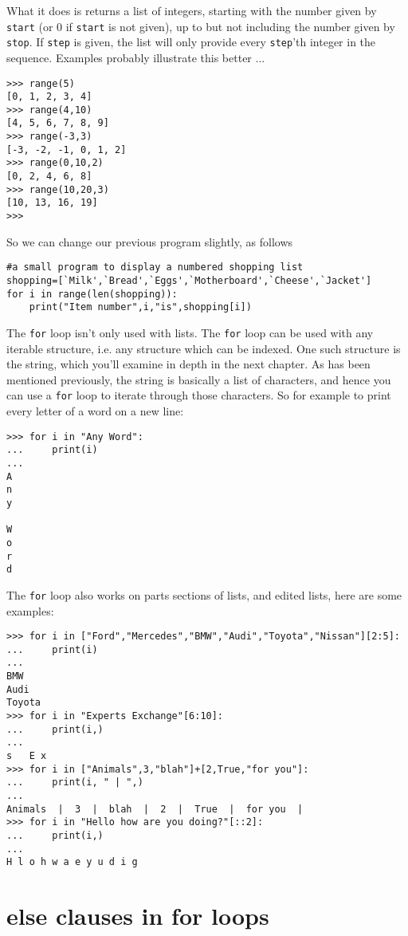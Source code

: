 What it does is returns a list of integers, starting with the number   given by \texttt{start} (or 0 if \texttt{start} is not given), up to but not including   the number given by \texttt{stop}. If \texttt{step} is given, the list will only   provide every \texttt{step}'th integer in the sequence. Examples probably   illustrate this better ...

\begin{lstlisting}
>>> range(5)
[0, 1, 2, 3, 4]
>>> range(4,10)
[4, 5, 6, 7, 8, 9]
>>> range(-3,3)
[-3, -2, -1, 0, 1, 2]
>>> range(0,10,2)
[0, 2, 4, 6, 8]
>>> range(10,20,3)
[10, 13, 16, 19]
>>>
\end{lstlisting}

So we can change our previous program slightly, as follows
\begin{lstlisting}
#a small program to display a numbered shopping list
shopping=[`Milk',`Bread',`Eggs',`Motherboard',`Cheese',`Jacket']
for i in range(len(shopping)):
    print("Item number",i,"is",shopping[i])
\end{lstlisting}

The \texttt{for} loop isn't only used with lists. The \texttt{for} loop can be used with any iterable structure, i.e. any structure which can be indexed. One such structure is the string, which you'll examine in depth in the next chapter. As has been mentioned previously, the string is basically a list of characters, and hence you can use a \texttt{for} loop to iterate through those characters. So for example to print every letter of a word on a new line:   
\begin{lstlisting}
>>> for i in "Any Word":
...     print(i)
... 
A
n
y
 
W
o
r
d
\end{lstlisting}

 The \texttt{for} loop also works on parts sections of lists, and edited lists, here are some examples:
\begin{lstlisting}
>>> for i in ["Ford","Mercedes","BMW","Audi","Toyota","Nissan"][2:5]:
...     print(i)
... 
BMW
Audi
Toyota
>>> for i in "Experts Exchange"[6:10]:
...     print(i,)
... 
s   E x
>>> for i in ["Animals",3,"blah"]+[2,True,"for you"]:
...     print(i, " | ",)
... 
Animals  |  3  |  blah  |  2  |  True  |  for you  | 
>>> for i in "Hello how are you doing?"[::2]:
...     print(i,)
... 
H l o h w a e y u d i g
\end{lstlisting}

\section{else clauses in for loops}

